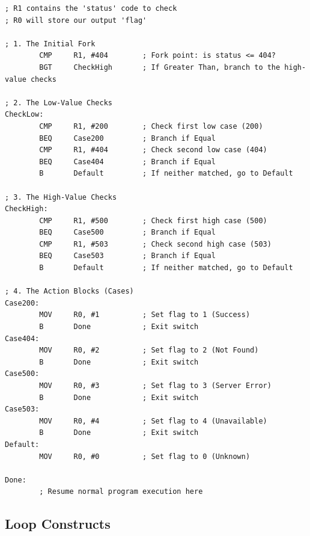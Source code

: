 \documentclass[../comorg-part1.tex]{subfiles}
\begin{document}
\begin{lstlisting}[language=ARM, title={Forked Cascade: HTTP Status Codes}, keepspaces=true]
; R1 contains the 'status' code to check
; R0 will store our output 'flag'

; 1. The Initial Fork
        CMP     R1, #404        ; Fork point: is status <= 404?
        BGT     CheckHigh       ; If Greater Than, branch to the high-value checks

; 2. The Low-Value Checks
CheckLow:
        CMP     R1, #200        ; Check first low case (200)
        BEQ     Case200         ; Branch if Equal
        CMP     R1, #404        ; Check second low case (404)
        BEQ     Case404         ; Branch if Equal
        B       Default         ; If neither matched, go to Default

; 3. The High-Value Checks
CheckHigh:
        CMP     R1, #500        ; Check first high case (500)
        BEQ     Case500         ; Branch if Equal
        CMP     R1, #503        ; Check second high case (503)
        BEQ     Case503         ; Branch if Equal
        B       Default         ; If neither matched, go to Default

; 4. The Action Blocks (Cases)
Case200:
        MOV     R0, #1          ; Set flag to 1 (Success)
        B       Done            ; Exit switch
Case404:
        MOV     R0, #2          ; Set flag to 2 (Not Found)
        B       Done            ; Exit switch
Case500:
        MOV     R0, #3          ; Set flag to 3 (Server Error)
        B       Done            ; Exit switch
Case503:
        MOV     R0, #4          ; Set flag to 4 (Unavailable)
        B       Done            ; Exit switch
Default:
        MOV     R0, #0          ; Set flag to 0 (Unknown)

Done:
        ; Resume normal program execution here
\end{lstlisting}

\subsection{Loop Constructs}
\end{document}
